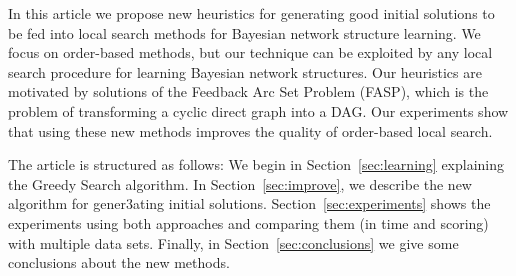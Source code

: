 In this article we propose new heuristics for generating good initial
solutions to be fed into local search methods for Bayesian network
structure learning. We focus on order-based methods, but our technique
can be exploited by any local search procedure for learning Bayesian
network structures. Our heuristics are motivated by solutions of the
Feedback Arc Set Problem (FASP), which is the problem of transforming a
cyclic direct graph into a DAG. Our experiments show that using these
new methods improves the quality of order-based local search.

The article is structured as follows: We begin in
Section~\ref{sec:learning} explaining the Greedy Search algorithm. In
Section~\ref{sec:improve}, we describe the new algorithm for gener3ating
initial solutions. Section~\ref{sec:experiments} shows the experiments
using both approaches and comparing them (in time and scoring) with
multiple data sets. Finally, in Section~\ref{sec:conclusions} we give
some conclusions about the new methods.
